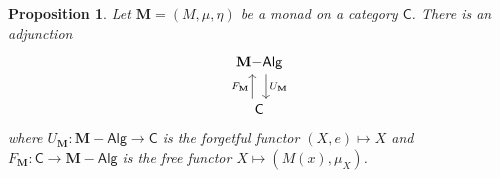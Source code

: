 \documentclass{article}
\newtheorem{prop}{Proposition}
\theoremstyle{definition}
\newcommand{\C}{\mathsf{C}}
\newcommand{\Alg}{\mathsf{Alg}}
\begin{document}
\begin{prop}
Let $\mathbf{M} = (M,\mu,\eta)$ be a monad on a category $\C$. There is an adjunction
\[\begin{tikzcd}[ampersand replacement=\&]
	{\mathbf{M}{-}\Alg} \\
	\C
	\arrow["{U_{\mathbf{M}}}", shift left=2, from=1-1, to=2-1]
	\arrow["{F_{\mathbf{M}}}", shift left=2, from=2-1, to=1-1]
\end{tikzcd}\]
where $U_{\mathbf{M}} : \mathbf{M}{-}\Alg \to \C$ is the forgetful functor $(X,e) \mapsto X$ and $F_{\mathbf{M}} : \C \to \mathbf{M}{-}\Alg$ is the free functor $X \mapsto (M(x), \mu_X)$.
\end{prop}
\end{document}
